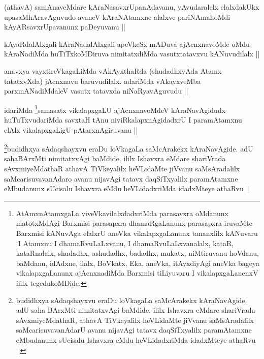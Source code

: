\begin{artha}
(athavA) samAnaveMdare kAraNasavxrUpanAdavanu, yAvudaralelx elalxdakUkx upasaMhAravAguvudo avaneV kAraNAtamxne alalxve pariNAmahoMdi kAyARsavxrUpavanunx paDeyuvanu ||
\end{artha}

\begin{artha}
kAyaRdalAlxgali kAraNadalAlxgali apeVkeSx mADuva ajAcnxnavoMde oMdu kAraNadiMda huTiTxkoMDiruva nimitatxdiMda vasutxtatavxvu kANuvudilalx ||
\end{artha}

\begin{artha}
anavxya vayxtireVkagaLiMda vAkAyxthaRda (shudadhxvAda Atamx tatatxvXda) jAcnxnavu baruvudilalx. adariMda vAkayxveMba parxmANadiMdaleV vasutx tatavxda niNaRyavAguvudu ||
\end{artha}

\begin{artha}
idariMda \footnote{AtAmxnAtamxgaLa viveVkavilalxdadxriMda parasavxra oMdanunx matotxMdAgi Barxmisi parasapxra dhamaRgaLanunx parasapxra iruvaMte Barxmisi kANuvAga elalxrU aneVka vikalapxgaLanunx tananxlilx kANuvaru `I Atamxnu I dhamaRvuLaLxvanu, I dhamaRvuLaLxvanalalx, kataR, kataRnalalx, shudadhx, ashudadhx, badadhx, mukatx, niMtiruvanu hoVdanu, baMdanu, idAdxne, ilalx, BoVkatx, Eka, aneVka, itAyxdiyAgi aneVka bageya vikalapxgaLanunx ajAcnxnadiMda Barxmisi tiLiyuvaru I vikalapxgaLanenxV ililx tegedukoMDide.}samasatx vikalapxgaLU ajAcnxnavoMdeV kAraNavAgidudx huTuTxvudariMda savxtaH tAnu niviRkalapxnAgidadxrU I paramAtamxnu elAlx vikalapxgaLigU pAtarxnAgiruvanu ||
\end{artha}

\begin{artha}
\footnote{budidhxya sAdaqshayxvu eraDu loVkagaLa saMcArakekx kAraNavAgide. adU saha BArxMti nimitatxvAgi baMdide. ililx Ishavxra eMdare shariVrada sAvxmiyeMdathaR, athavA TiVkeyalilx heVLidaMte jiVvanu saMsAradalilx saMcarisuvavanAdarU avanu nijavAgi tatavx daqSiTxyalilx paramAtamxne eMbudanunx sUcisalu Ishavxra eMdu heVLidadxriMda idadxMteye athaRvu ||}budidhxya sAdaqshayxvu eraDu loVkagaLa saMcArakekx kAraNavAgide. adU sahaBArxMti nimitatxvAgi baMdide. ililx Ishavxra eMdare shariVrada sAvxmiyeMdathaR athavA TiVkeyalilx heVLidaMte jiVvanu saMsAradalilx saMcarisuvavanAdaro avanu nijavAgi tatavx daqSiTxyalilx paramAtamxne eMbudanunx sUcisalu Ishavxra eMdu heVLidadxriMda idadxMteye athaRvu ||
\end{artha}


